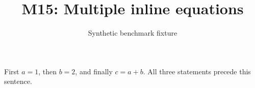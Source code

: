 \documentclass{article}
\title{M15: Multiple inline equations}
\author{Synthetic benchmark fixture}
\date{}
\begin{document}
\maketitle
First \(a=1\), then \(b=2\), and finally \(c=a+b\). All three statements precede this sentence.
\end{document}
